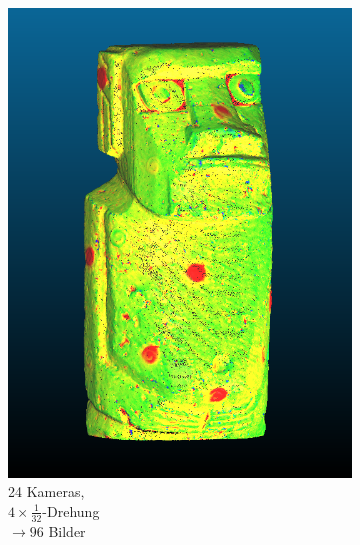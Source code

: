\documentclass[./00PhotoBox.tex]{subfiles}
\begin{document}
\begin{figure}
\begin{subfigure}{0.30\textwidth}
        \includegraphics[width=1\linewidth]{img/cam_anzahl/feinschritt.png}
        \centering
        \caption{
            24 Kameras,\\
            $4 \times \frac{1}{32}$-Drehung\\
            $\rightarrow 96$ Bilder
        }
        \label{img:moai_feinschritt}
    \end{subfigure}
    \begin{subfigure}{0.30\textwidth}

\end{subfigure}
\end{figure}
\end{document}

